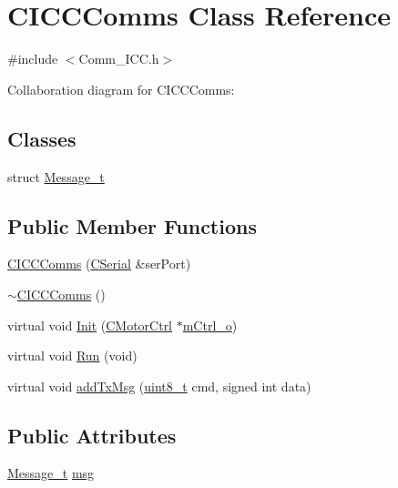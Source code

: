 \hypertarget{class_c_i_c_c_comms}{}\section{C\+I\+C\+C\+Comms Class Reference}
\label{class_c_i_c_c_comms}


{\ttfamily \#include $<$Comm\+\_\+\+I\+C\+C.\+h$>$}



Collaboration diagram for C\+I\+C\+C\+Comms\+:
\subsection*{Classes}
\begin{DoxyCompactItemize}
\item 
struct \mbox{\hyperlink{struct_c_i_c_c_comms_1_1_message__t}{Message\+\_\+t}}
\end{DoxyCompactItemize}
\subsection*{Public Member Functions}
\begin{DoxyCompactItemize}
\item 
\mbox{\hyperlink{class_c_i_c_c_comms_af2cb9bb6ab473bc5ea2b4aa2f98084ff}{C\+I\+C\+C\+Comms}} (\mbox{\hyperlink{class_c_serial}{C\+Serial}} \&ser\+Port)
\item 
\mbox{\hyperlink{class_c_i_c_c_comms_a951ae11fd2024309bd4ecf67981287e7}{$\sim$\+C\+I\+C\+C\+Comms}} ()
\item 
virtual void \mbox{\hyperlink{class_c_i_c_c_comms_a56fc0858965ed1f1f9b3295602472c7e}{Init}} (\mbox{\hyperlink{class_c_motor_ctrl}{C\+Motor\+Ctrl}} $\ast$\mbox{\hyperlink{_a_d_a_s___m_c_u_8ino_ab618fa643b3224c905b4fcbd074fb481}{m\+Ctrl\+\_\+o}})
\item 
virtual void \mbox{\hyperlink{class_c_i_c_c_comms_a8b3fa81307b3b9ba0e72b4aee8279c56}{Run}} (void)
\item 
virtual void \mbox{\hyperlink{class_c_i_c_c_comms_ab925dd7ff82f30ccd9f770ab2281b3ab}{add\+Tx\+Msg}} (\mbox{\hyperlink{_a_d_a_s___types_8h_aba7bc1797add20fe3efdf37ced1182c5}{uint8\+\_\+t}} cmd, signed int data)
\end{DoxyCompactItemize}
\subsection*{Public Attributes}
\begin{DoxyCompactItemize}
\item 
\mbox{\hyperlink{struct_c_i_c_c_comms_1_1_message__t}{Message\+\_\+t}} \mbox{\hyperlink{class_c_i_c_c_comms_a35a59d11110d830b70ab5e2a5644bbb9}{msg}}
\end{DoxyCompactItemize}


